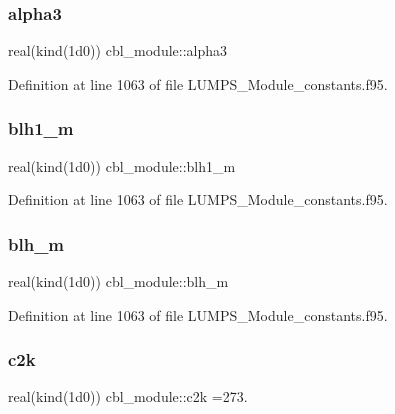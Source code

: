 \subsubsection{\texorpdfstring{alpha3}{alpha3}}
{\footnotesize\ttfamily real(kind(1d0)) cbl\+\_\+module\+::alpha3}



Definition at line 1063 of file L\+U\+M\+P\+S\+\_\+\+Module\+\_\+constants.\+f95.

\mbox{\label{namespacecbl__module_a19dd722436e710830c7ff6b961753c62}} 
\subsubsection{\texorpdfstring{blh1\+\_\+m}{blh1\_m}}
{\footnotesize\ttfamily real(kind(1d0)) cbl\+\_\+module\+::blh1\+\_\+m}



Definition at line 1063 of file L\+U\+M\+P\+S\+\_\+\+Module\+\_\+constants.\+f95.

\mbox{\label{namespacecbl__module_a20477a72c625deb14eccf5e2cd767d95}} 
\subsubsection{\texorpdfstring{blh\+\_\+m}{blh\_m}}
{\footnotesize\ttfamily real(kind(1d0)) cbl\+\_\+module\+::blh\+\_\+m}



Definition at line 1063 of file L\+U\+M\+P\+S\+\_\+\+Module\+\_\+constants.\+f95.

\mbox{\label{namespacecbl__module_a295b5b9a6a2d8808cba5c386dd4ed2e6}} 
\subsubsection{\texorpdfstring{c2k}{c2k}}
{\footnotesize\ttfamily real(kind(1d0)) cbl\+\_\+module\+::c2k =273.}



